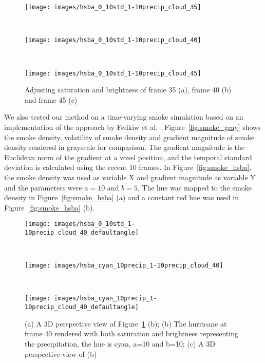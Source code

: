 \begin{figure}
\centering
\begin{minipage}{.33\textwidth}
\texttt{[image: images/hsba\_0\_10std\_1-10precip\_cloud\_35]}
\subcaption{}
\end{minipage}~
\begin{minipage}{.33\textwidth}
\texttt{[image: images/hsba\_0\_10std\_1-10precip\_cloud\_40]}
\subcaption{}
\end{minipage}~
\begin{minipage}{.33\textwidth}
\texttt{[image: images/hsba\_0\_10std\_1-10precip\_cloud\_45]}
\subcaption{}
\end{minipage}
\caption{Adjusting saturation and brightness of frame 35 (a), frame 40 (b) and frame 45 (c)}
\label{fig:hurricane_hsba}
\end{figure}

We also tested our method on a time-varying smoke simulation based on an implementation of the approach by Fedkiw et al. \cite{fedkiw_visual_2001}. Figure~\ref{fig:smoke_gray} shows the smoke density, volatility of smoke density and gradient magnitude of smoke density rendered in grayscale for comparison.
The gradient magnitude is the Euclidean norm of the gradient at a voxel position,
and the temporal standard deviation is calculated using the recent 10 frames.
In Figure~\ref{fig:smoke_hsba}, the smoke density was used as variable X and gradient magnitude as variable Y and the parameters were $a=10$ and $b=5$.
The hue was mapped to the smoke density in Figure~\ref{fig:smoke_hsba} (a) and a constant red hue was used in Figure~\ref{fig:smoke_hsba} (b).

\begin{figure}
\centering
\begin{minipage}{.34\textwidth}
\texttt{[image: images/hsba\_0\_10std\_1-10precip\_cloud\_40\_defaultangle]}
\subcaption{}
\end{minipage}~
\begin{minipage}{.32\textwidth}
\texttt{[image: images/hsba\_cyan\_10precip\_1-10precip\_cloud\_40]}
\subcaption{}
\end{minipage}~
\begin{minipage}{.34\textwidth}
\texttt{[image: images/hsba\_cyan\_10precip\_1-10precip\_cloud\_40\_defaultangle]}
\subcaption{}
\end{minipage}
\caption{(a) A 3D perspective view of Figure~\ref{fig:hurricane_hsba} (b); (b) The hurricane at frame 40 rendered with both saturation and brightness representing the precipitation, the hue is cyan, a=10 and b=10; (c) A 3D perspective view of (b)}
\label{fig:hurricane_40_cyan}
\end{figure}

